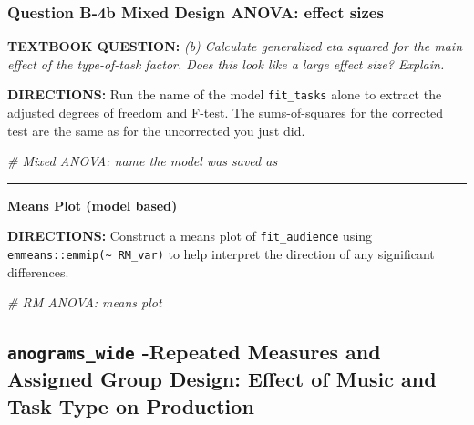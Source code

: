\documentclass[
]{article}
\newenvironment{Shaded}{\begin{snugshade}}{\end{snugshade}}
\newcommand{\CommentTok}[1]{\textcolor[rgb]{0.56,0.35,0.01}{\textit{#1}}}
\begin{document}
\clearpage

\hypertarget{question-b-4b-mixed-design-anova-effect-sizes}{%
\subsubsection{Question B-4b Mixed Design ANOVA: effect
sizes}\label{question-b-4b-mixed-design-anova-effect-sizes}}

\textbf{TEXTBOOK QUESTION:} \emph{(b) Calculate generalized eta squared
for the main effect of the type-of-task factor. Does this look like a
large effect size? Explain.}

\textbf{DIRECTIONS:} Run the name of the model \texttt{fit\_tasks} alone
to extract the adjusted degrees of freedom and F-test. The
sums-of-squares for the corrected test are the same as for the
uncorrected you just did.

\begin{Shaded}
\begin{Highlighting}[]
\CommentTok{# Mixed ANOVA: name the model was saved as}
\end{Highlighting}
\end{Shaded}

\begin{center}\rule{0.5\linewidth}{\linethickness}\end{center}

\textbf{Means Plot (model based)}

\textbf{DIRECTIONS:} Construct a means plot of \texttt{fit\_audience}
using \texttt{emmeans::emmip(\textasciitilde{}\ RM\_var)} to help
interpret the direction of any significant differences.

\begin{Shaded}
\begin{Highlighting}[]
\CommentTok{# RM ANOVA: means plot}
\end{Highlighting}
\end{Shaded}

\clearpage

\hypertarget{anograms_wide--repeated-measures-and-assigned-group-design-effect-of-music-and-task-type-on-production}{%
\subsection{\texorpdfstring{\texttt{anograms\_wide} -Repeated Measures
and Assigned Group Design: Effect of Music and Task Type on
Production}{anograms\_wide -Repeated Measures and Assigned Group Design: Effect of Music and Task Type on Production}}\label{anograms_wide--repeated-measures-and-assigned-group-design-effect-of-music-and-task-type-on-production}}
\end{document}
